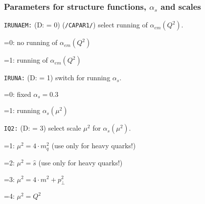 \documentclass[11pt]{article} \usepackage{mystyle-new}
\newcommand{\deflab}[1]{#1\hfil}%
\newenvironment{defl}[1]%
  {\begin{list}{}{\settowidth{\labelwidth}{#1}%
  \setlength{\leftmargin}{\labelwidth}%
  \addtolength{\leftmargin}{\labelsep}%
  \setlength{\itemsep}{0pt plus 1pt}
  \setlength{\parsep}{0pt plus 1pt}
  \setlength{\topsep}{0pt plus 1pt}
  \setlength{\partopsep}{0pt plus 1pt}
  \setlength{\parskip}{2mm plus 1mm minus 1mm}
  \let\makelabel\deflab}}%
  {\end{list}}
\begin{document}
\subsubsection{Parameters for structure functions, $\alpha_s$ and scales}
\label{sec:alphas}
\begin{defl}{123456789012345}
\item[{\tt IRUNAEM:}]  (D: = 0) ({\tt /CAPAR1/})
                   select running of $\alpha _{em}(Q^2)$.
\item[]
                        =0:  no running of $\alpha _{em}(Q^2)$
\item[]
                        =1:  running of $\alpha _{em}(Q^2)$


\item[{\tt IRUNA:}]  (D: = 1)
                        switch for running $\alpha _s$.
\item[]
                        =0:  fixed $\alpha_s=0.3$ 
\item[]
                        =1: running $\alpha _s(\mu^2)$
\item[{\tt IQ2:}]  (D: = 3)
                   select scale $\mu^2$ for $\alpha _s(\mu^2)$.
\item[]
                        =1:  $\mu^2 = 4 \cdot m_{q} ^2$
                             (use only for heavy quarks!)
\item[]
                        =2:  $\mu^2 = \hat{s} $
                             (use only for heavy quarks!)
\item[]
                        =3:  $\mu^2 = 4 \cdot m^2 + p_{\perp} ^2$
                             
\item[]
                        =4:  $\mu^2 = Q^2$
                        

\end{defl}
\end{document}
